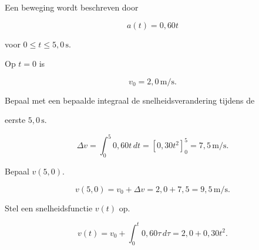 \documentclass{ximera}
\begin{document}
\begin{oefening}{\oefU\ESS}

Een beweging wordt beschreven door

\[a(t)=0,60t\]

voor $0\leq t\leq5,0\,\mathrm{s}$.

Op $t=0$ is

\[v_0=2,0\,\mathrm{m/s}.\]

\begin{question}

Bepaal met een bepaalde integraal de snelheidsverandering tijdens de

eerste $5,0\,\mathrm{s}$.

\begin{oplossing}
\[\Delta v=\int_0^5 0,60t\,dt =\left[0,30t^2\right]_0^5 =7,5\,\mathrm{m/s}.\]
\end{oplossing}

\end{question}

\begin{question}

Bepaal $v(5,0)$.

\begin{oplossing}
\[v(5,0)=v_0+\Delta v=2,0+7,5=9,5\,\mathrm{m/s}.\]
\end{oplossing}

\end{question}

\begin{question}

Stel een snelheidsfunctie $v(t)$ op.

\begin{oplossing}
\[v(t)=v_0+\int_0^t0,60\tau\,d\tau=2,0+0,30t^2.\]
\end{oplossing}

\end{question}

\end{oefening}
\end{document}
